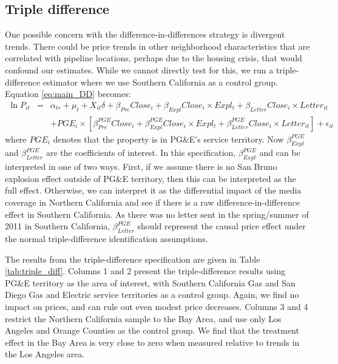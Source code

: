 \documentclass[12pt]{article}
\begin{document}
\subsection{Triple difference}

One possible concern with the difference-in-differences strategy is
divergent trends. There could be price trends in other neighborhood
characteristics that are correlated with pipeline locations, perhaps
due to the housing crisis, that would confound our estimates. While
we cannot directly test for this, we run a triple-difference estimator
where we use Southern California as a control group. Equation \ref{eq:main_DD}
becomes: 
\begin{eqnarray}
\ln P_{it} & = & \alpha_{tr}+\mu_{t}+X_{it}\delta+\beta_{Pre}Close_{i}+\beta_{Expl}Close_{i}\times Expl_{t}+\beta_{Letter}Close_{i}\times Letter_{it}\nonumber \\
 &  & +PGE_{i}\times[\beta_{Pre}^{PGE}Close_{i}+\beta_{Expl}^{PGE}Close_{i}\times Expl_{t}+\beta_{Letter}^{PGE}Close_{i}\times Letter_{it}]+\epsilon_{it}\label{eq:ddd}
\end{eqnarray}
where $PGE_{i}$ denotes that the property is in PG\&E's service territory.
Now $\beta_{Expl}^{PGE}$ and $\beta_{Letter}^{PGE}$ are the coefficients
of interest. In this specification, $\beta_{Expl}^{PGE}$ and can
be interpreted in one of two ways. First, if we assume there is no
San Bruno explosion effect outside of PG\&E territory, then this can
be interpreted as the full effect. Otherwise, we can interpret it
as the differential impact of the media coverage in Northern California
and see if there is a raw difference-in-difference effect in Southern
California. As there was no letter sent in the spring/summer of 2011
in Southern California, $\beta_{Letter}^{PGE}$ should represent the
causal price effect under the normal triple-difference identification
assumptions.

The results from the triple-difference specification are given in
Table \ref{tab:triple_diff}. Columns 1 and 2 present the triple-difference
results using PG\&E territory as the area of interest, with Southern
California Gas and San Diego Gas and Electric service territories
as a control group. Again, we find no impact on prices, and can rule
out even modest price decreases. Columns 3 and 4 restrict the Northern
California sample to the Bay Area, and use only Los Angeles and Orange
Counties as the control group. We find that the treatment effect in
the Bay Area is very close to zero when measured relative to trends
in the Los Angeles area.
\end{document}
